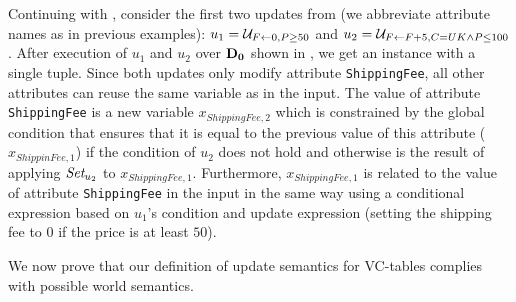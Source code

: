 %
%
\begin{exam}\label{ex:up-vctb}
Continuing with , consider the first two updates from  (we abbreviate attribute names as in previous examples): $u_1 = \mathcal{U}_{F \gets 0,P \geq 50}$  %
and $u_2 = \mathcal{U}_{F \gets F + 5,C = UK \land P \leq 100}$. %
%
%
%
After execution of $u_1$ and $u_2$ over $\mathbf{D_0}$ shown in , we get an instance with a single tuple. Since both updates only modify attribute \texttt{ShippingFee}, all other attributes can reuse the same variable as in the input.  %
The value of attribute \texttt{ShippingFee} is a new variable $x_{ShippingFee,2}$ which is constrained by the global condition that ensures that it is equal to the previous value of this attribute ($x_{ShippinFee,1}$) if the condition of $u_2$ does not hold and otherwise is the result of applying  $\textit{Set}_{u_2}$ to $x_{ShippingFee,1}$. Furthermore, $x_{ShippingFee,1}$ is related to the value of attribute \texttt{ShippingFee} in the input in the same way using a conditional expression based on $u_1$'s condition and update expression (setting the shipping fee to $0$ if the price is at least $50$).
%
%
%
%
%
\end{exam}

We now prove that our definition of  update semantics for VC-tables complies with possible world semantics. %


